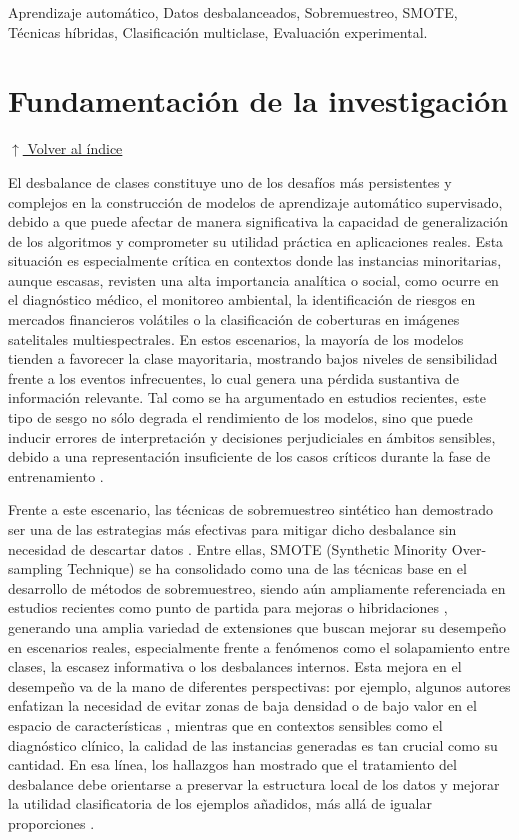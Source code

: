 \documentclass[12pt,a4paper]{article}
\begin{document}
Aprendizaje automático, Datos desbalanceados, Sobremuestreo, SMOTE, Técnicas híbridas, Clasificación multiclase, Evaluación experimental.

\section{Fundamentación de la investigación}
\noindent\hyperlink{toc}{\small$\uparrow$ Volver al índice}

El desbalance de clases constituye uno de los desafíos más persistentes y complejos en la construcción de modelos de aprendizaje automático supervisado, debido a que puede afectar de manera significativa la capacidad de generalización de los algoritmos y comprometer su utilidad práctica en aplicaciones reales. Esta situación es especialmente crítica en contextos donde las instancias minoritarias, aunque escasas, revisten una alta importancia analítica o social, como ocurre en el diagnóstico médico, el monitoreo ambiental, la identificación de riesgos en mercados financieros volátiles o la clasificación de coberturas en imágenes satelitales multiespectrales. En estos escenarios, la mayoría de los modelos tienden a favorecer la clase mayoritaria, mostrando bajos niveles de sensibilidad frente a los eventos infrecuentes, lo cual genera una pérdida sustantiva de información relevante. Tal como se ha argumentado en estudios recientes, este tipo de sesgo no sólo degrada el rendimiento de los modelos, sino que puede inducir errores de interpretación y decisiones perjudiciales en ámbitos sensibles, debido a una representación insuficiente de los casos críticos durante la fase de entrenamiento \parencite{poddar2024approaches}.


Frente a este escenario, las técnicas de sobremuestreo sintético han demostrado ser una de las estrategias más efectivas para mitigar dicho desbalance sin necesidad de descartar datos \parencite{khorshidi2025synthetic, carvalho2025resampling}. Entre ellas, SMOTE (Synthetic Minority Over-sampling Technique) se ha consolidado como una de las técnicas base en el desarrollo de métodos de sobremuestreo, siendo aún ampliamente referenciada en estudios recientes como punto de partida para mejoras o hibridaciones \parencite{wang2025aoch, nasaruddin2025smote}, generando una amplia variedad de extensiones que buscan mejorar su desempeño en escenarios reales, especialmente frente a fenómenos como el solapamiento entre clases, la escasez informativa o los desbalances internos. Esta mejora en el desempeño va de la mano de diferentes perspectivas: por ejemplo, algunos autores enfatizan la necesidad de evitar zonas de baja densidad o de bajo valor en el espacio de características \parencite{lyu2025ld, qiu2025vs}, mientras que en contextos sensibles como el diagnóstico clínico, la calidad de las instancias generadas es tan crucial como su cantidad. En esa línea, los hallazgos han mostrado que el tratamiento del desbalance debe orientarse a preservar la estructura local de los datos y mejorar la utilidad clasificatoria de los ejemplos añadidos, más allá de igualar proporciones \parencite{wang2024aCH}.
\end{document}
